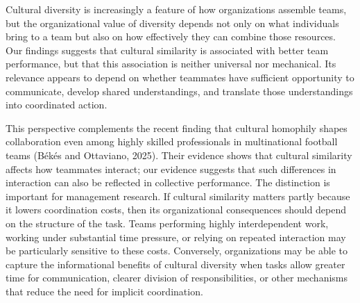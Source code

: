 \documentclass[10pt]{article}
\begin{document}

Cultural diversity is increasingly a feature of how organizations assemble teams, but the organizational value of diversity depends not only on what individuals bring to a team but also on how effectively they can combine those resources. %
Our findings suggests that cultural similarity is associated with better team performance, but that this association is neither universal nor mechanical. Its relevance appears to depend on whether teammates have sufficient opportunity to communicate, develop shared understandings, and translate those understandings into coordinated action.

This perspective complements the recent finding that cultural homophily shapes collaboration even among highly skilled professionals in multinational football teams (Békés and Ottaviano, 2025). Their evidence shows that cultural similarity affects how teammates interact; our evidence suggests that such differences in interaction can also be reflected in collective performance. The distinction is important for management research. If cultural similarity matters partly because it lowers coordination costs, then its organizational consequences should depend on the structure of the task. Teams performing highly interdependent work, working under substantial time pressure, or relying on repeated interaction may be particularly sensitive to these costs. Conversely, organizations may be able to capture the informational benefits of cultural diversity when tasks allow greater time for communication, clearer division of responsibilities, or other mechanisms that reduce the need for implicit coordination.
\end{document}
